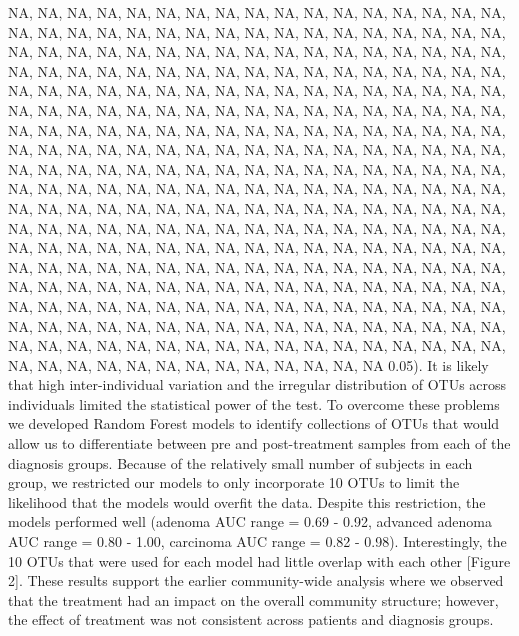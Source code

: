 \documentclass[12pt,]{article}
\begin{document}
NA, NA, NA, NA, NA, NA, NA, NA, NA, NA, NA, NA, NA, NA, NA, NA, NA, NA,
NA, NA, NA, NA, NA, NA, NA, NA, NA, NA, NA, NA, NA, NA, NA, NA, NA, NA,
NA, NA, NA, NA, NA, NA, NA, NA, NA, NA, NA, NA, NA, NA, NA, NA, NA, NA,
NA, NA, NA, NA, NA, NA, NA, NA, NA, NA, NA, NA, NA, NA, NA, NA, NA, NA,
NA, NA, NA, NA, NA, NA, NA, NA, NA, NA, NA, NA, NA, NA, NA, NA, NA, NA,
NA, NA, NA, NA, NA, NA, NA, NA, NA, NA, NA, NA, NA, NA, NA, NA, NA, NA,
NA, NA, NA, NA, NA, NA, NA, NA, NA, NA, NA, NA, NA, NA, NA, NA, NA, NA,
NA, NA, NA, NA, NA, NA, NA, NA, NA, NA, NA, NA, NA, NA, NA, NA, NA, NA,
NA, NA, NA, NA, NA, NA, NA, NA, NA, NA, NA, NA, NA, NA, NA, NA, NA, NA,
NA, NA, NA, NA, NA, NA, NA, NA, NA, NA, NA, NA, NA, NA, NA, NA, NA, NA,
NA, NA, NA, NA, NA, NA, NA, NA, NA, NA, NA, NA, NA, NA, NA, NA, NA, NA,
NA, NA, NA, NA, NA, NA, NA, NA, NA, NA, NA, NA, NA, NA, NA, NA, NA, NA,
NA, NA, NA, NA, NA, NA, NA, NA, NA, NA, NA, NA, NA, NA, NA, NA, NA, NA,
NA, NA, NA, NA, NA, NA, NA, NA, NA, NA, NA, NA, NA, NA, NA, NA, NA, NA,
NA, NA, NA, NA, NA, NA, NA, NA, NA, NA, NA, NA, NA, NA, NA, NA, NA, NA,
NA, NA, NA, NA, NA, NA, NA, NA, NA, NA, NA, NA, NA, NA, NA, NA, NA, NA,
NA, NA, NA, NA, NA, NA, NA, NA, NA, NA, NA, NA, NA, NA, NA, NA, NA, NA,
NA, NA, NA, NA, NA, NA, NA, NA, NA, NA, NA, NA, NA 0.05). It is likely
that high inter-individual variation and the irregular distribution of
OTUs across individuals limited the statistical power of the test. To
overcome these problems we developed Random Forest models to identify
collections of OTUs that would allow us to differentiate between pre and
post-treatment samples from each of the diagnosis groups. Because of the
relatively small number of subjects in each group, we restricted our
models to only incorporate 10 OTUs to limit the likelihood that the
models would overfit the data. Despite this restriction, the models
performed well (adenoma AUC range = 0.69 - 0.92, advanced adenoma AUC
range = 0.80 - 1.00, carcinoma AUC range = 0.82 - 0.98). Interestingly,
the 10 OTUs that were used for each model had little overlap with each
other {[}Figure 2{]}. These results support the earlier community-wide
analysis where we observed that the treatment had an impact on the
overall community structure; however, the effect of treatment was not
consistent across patients and diagnosis groups.
\end{document}
